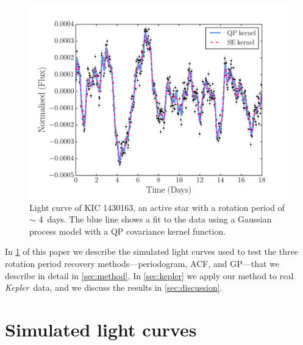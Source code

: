 \documentclass[useAMS, usenatbib, preprint, 12pt]{aastex}
\newcommand{\kepexample}{1430163}
\newcommand{\kepexampleperiod}{4}
\newcommand{\Kepler}{{\it Kepler}}
\newcommand{\kepler}{\Kepler}
\begin{document}
\begin{figure}
\begin{center}
\includegraphics[width=6in, clip=true]{figures/001430163.pdf}
\caption[A light curve with a GP model.]
{Light curve of KIC \kepexample, an active star with a rotation period of
$\sim$ \kepexampleperiod\ days.
The blue line shows a fit to the data using a Gaussian process model with a QP
covariance kernel function.}
\label{fig:GP_example}
\end{center}
\end{figure}

In \textsection \ref{sec:simulations} of this paper we describe the simulated
light curves used to test the three rotation period recovery methods---periodogram,
ACF, and GP---that we describe in detail in \textsection \ref{sec:method}.
In \textsection \ref{sec:kepler} we apply our method to real \kepler\ data, and
we discuss the results in \textsection \ref{sec:discussion}.

\section{Simulated light curves}
\label{sec:simulations}
\end{document}
